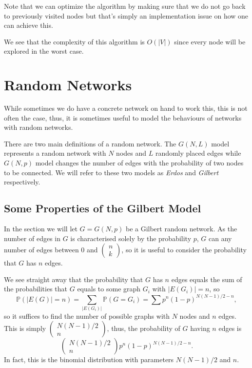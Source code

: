 \documentclass[
]{article}
\theoremstyle{definition}
\begin{document}
Note that we can optimize the algorithm by making sure that we do not go
back to previously visited nodes but that's simply an implementation
issue on how one can achieve this.

We see that the complexity of this algorithm is \(O(\left|V\right|)\)
since every node will be explored in the worst case.

\hypertarget{random-networks}{%
\section{Random Networks}\label{random-networks}}

While sometimes we do have a concrete network on hand to work this, this
is not often the case, thus, it is sometimes useful to model the
behaviours of networks with random networks.

There are two main definitions of a random network. The \(G(N, L)\)
model represents a random network with \(N\) nodes and \(L\) randomly
placed edges while \(G(N, p)\) model changes the number of edges with
the probability of two nodes to be connected. We will refer to these two
models as \emph{Erdos} and \emph{Gilbert} respectively.

\hypertarget{some-properties-of-the-gilbert-model}{%
\subsection{Some Properties of the Gilbert
Model}\label{some-properties-of-the-gilbert-model}}

In the section we will let \(G = G(N, p)\) be a Gilbert random network.
As the number of edges in \(G\) is characterised solely by the
probability \(p\), \(G\) can any number of edges between 0 and
\(\begin{pmatrix} n \\ k \end{pmatrix}\), so it is useful to consider
the probability that \(G\) has \(n\) edges.

We see straight away that the probability that \(G\) has \(n\) edges
equals the sum of the probabilities that \(G\) equals to some graph
\(G_i\) with \(\left| E(G_i) \right| = n\), so
\[\mathbb{P}(\left| E(G) \right| = n) = \sum_{\left| E(G_i) \right|}\mathbb{P}(G = G_i)
  = \sum p^n (1 - p)^{N (N - 1) / 2 - n},\] so it suffices to find the
number of possible graphs with \(N\) nodes and \(n\) edges. This is
simply \(\begin{pmatrix} N (N - 1) / 2 \\ n \end{pmatrix}\), thus, the
probability of \(G\) having \(n\) edges is
\[\begin{pmatrix} N (N - 1) / 2 \\ n \end{pmatrix}p^n (1 - p)^{N (N - 1) / 2 - n}.\]
In fact, this is the binomial distribution with parameters
\(N (N - 1) / 2\) and \(n\).
\end{document}
